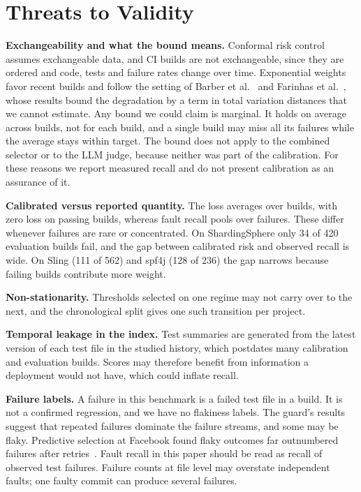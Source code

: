 \section{Threats to Validity}
\label{sec:threats}

\textbf{Exchangeability and what the bound means.} Conformal risk control assumes exchangeable data, and CI builds are not exchangeable, since they are ordered and code, tests and failure rates change over time. Exponential weights favor recent builds and follow the setting of Barber et al.~\cite{barber2023beyond} and Farinhas et al.~\cite{farinhas2024nonexchangeable}, whose results bound the degradation by a term in total variation distances that we cannot estimate. Any bound we could claim is marginal. It holds on average across builds, not for each build, and a single build may miss all its failures while the average stays within target. The bound does not apply to the combined selector or to the LLM judge, because neither was part of the calibration. For these reasons we report measured recall and do not present calibration as an assurance of it.

\textbf{Calibrated versus reported quantity.} The loss averages over builds, with zero loss on passing builds, whereas fault recall pools over failures. These differ whenever failures are rare or concentrated. On ShardingSphere only 34 of 420 evaluation builds fail, and the gap between calibrated risk and observed recall is wide. On Sling (111 of 562) and spf4j (128 of 236) the gap narrows because failing builds contribute more weight.

\textbf{Non-stationarity.} Thresholds selected on one regime may not carry over to the next, and the chronological split gives one such transition per project.

\textbf{Temporal leakage in the index.} Test summaries are generated from the latest version of each test file in the studied history, which postdates many calibration and evaluation builds. Scores may therefore benefit from information a deployment would not have, which could inflate recall.

\textbf{Failure labels.} A failure in this benchmark is a failed test file in a build. It is not a confirmed regression, and we have no flakiness labels. The guard's results suggest that repeated failures dominate the failure streams, and some may be flaky. Predictive selection at Facebook found flaky outcomes far outnumbered failures after retries~\cite{machalica2019predictive}. Fault recall in this paper should be read as recall of observed test failures. Failure counts at file level may overstate independent faults; one faulty commit can produce several failures.

